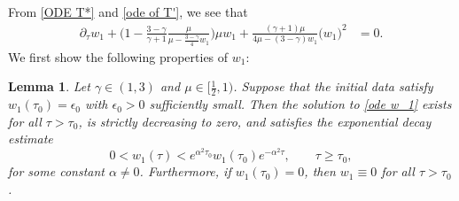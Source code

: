 \documentclass{article}
\newcommand{\ga}{\gamma}
\newcommand{\al}{\alpha}
\def\be{\begin{equation}}
\def\ee{\end{equation}}
\numberwithin{equation}{section}
\newtheorem{lemma}[theorem]{Lemma}
\begin{document}
From \eqref{ODE T*} and \eqref{ode of T'}, we see that
\begin{align}\label{ode w_1}
	\partial_\tau w_1  + \Big(1-\frac{3-\ga}{\ga+1}\frac{\mu}{\mu-\frac{3-\ga}{4}w_1}\Big) \mu w_1  +\frac{(\ga+1)\mu}{4\mu-(3-\ga)w_1}\big(w_1\big)^2&= 0.
\end{align}
We first show the following properties of $w_1$: 
\begin{lemma}\label{lemma w_1}
	Let $\ga\in(1,3)$ and $\mu\in[\frac12,1)$. Suppose that the initial data satisfy $w_1(\tau_0) = \epsilon_0$ with $\epsilon_0>0$ sufficiently small. Then the solution to \eqref{ode w_1} exists for all $\tau>\tau_0$, is strictly decreasing to zero, and satisfies the exponential decay estimate
	\be\label{estimate of w_1}
	0<w_1(\tau)< e^{\al^2 \tau_0}w_1(\tau_0)e^{-\al^2 \tau},\qquad \tau \geq \tau_0,
	\ee
for some constant $\alpha \neq 0$. Furthermore, if $w_1(\tau_0) = 0$, then $w_1 \equiv 0$ for all $\tau > \tau_0$.
\end{lemma}
\end{document}
